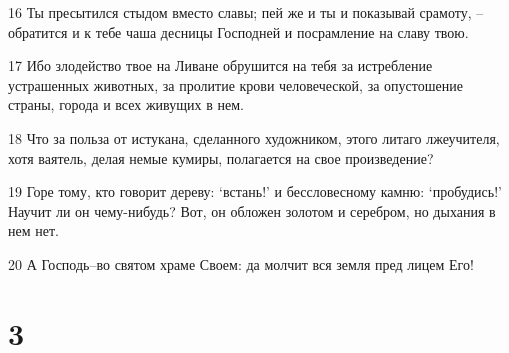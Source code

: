 \par 16 Ты пресытился стыдом вместо славы; пей же и ты и показывай срамоту, --обратится и к тебе чаша десницы Господней и посрамление на славу твою.
\par 17 Ибо злодейство твое на Ливане обрушится на тебя за истребление устрашенных животных, за пролитие крови человеческой, за опустошение страны, города и всех живущих в нем.
\par 18 Что за польза от истукана, сделанного художником, этого литаго лжеучителя, хотя ваятель, делая немые кумиры, полагается на свое произведение?
\par 19 Горе тому, кто говорит дереву: `встань!' и бессловесному камню: `пробудись!' Научит ли он чему-нибудь? Вот, он обложен золотом и серебром, но дыхания в нем нет.
\par 20 А Господь--во святом храме Своем: да молчит вся земля пред лицем Его!

\chapter{3}

